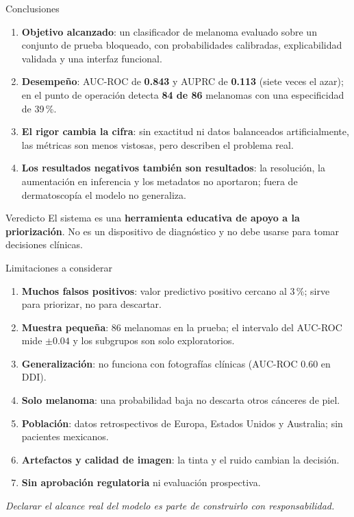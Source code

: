 \documentclass[aspectratio=169,10pt]{beamer}
\begin{document}
\begin{frame}{Conclusiones}
  \begin{enumerate}
    \item \textbf{Objetivo alcanzado}: un clasificador de melanoma evaluado sobre un conjunto de prueba bloqueado, con probabilidades calibradas, explicabilidad validada y una interfaz funcional.
    \item \textbf{Desempeño}: AUC-ROC de \textbf{0.843} y AUPRC de \textbf{0.113} (siete veces el azar); en el punto de operación detecta \textbf{84 de 86} melanomas con una especificidad de 39\,\%.
    \item \textbf{El rigor cambia la cifra}: sin exactitud ni datos balanceados artificialmente, las métricas son menos vistosas, pero describen el problema real.
    \item \textbf{Los resultados negativos también son resultados}: la resolución, la aumentación en inferencia y los metadatos no aportaron; fuera de dermatoscopía el modelo no generaliza.
  \end{enumerate}
  \begin{exampleblock}{Veredicto}
    El sistema es una \textbf{herramienta educativa de apoyo a la priorización}. No es un dispositivo de diagnóstico y no debe usarse para tomar decisiones clínicas.
  \end{exampleblock}
\end{frame}

\begin{frame}{Limitaciones a considerar}
  \begin{enumerate}
    \item \textbf{Muchos falsos positivos}: valor predictivo positivo cercano al 3\,\%; sirve para priorizar, no para descartar.
    \item \textbf{Muestra pequeña}: 86 melanomas en la prueba; el intervalo del AUC-ROC mide $\pm 0.04$ y los subgrupos son solo exploratorios.
    \item \textbf{Generalización}: no funciona con fotografías clínicas (AUC-ROC 0.60 en DDI).
    \item \textbf{Solo melanoma}: una probabilidad baja no descarta otros cánceres de piel.
    \item \textbf{Población}: datos retrospectivos de Europa, Estados Unidos y Australia; sin pacientes mexicanos.
    \item \textbf{Artefactos y calidad de imagen}: la tinta y el ruido cambian la decisión.
    \item \textbf{Sin aprobación regulatoria} ni evaluación prospectiva.
  \end{enumerate}
  \vspace{0.4em}
  \begin{center}
    \small\textit{Declarar el alcance real del modelo es parte de construirlo con responsabilidad.}
  \end{center}
\end{frame}
\end{document}
